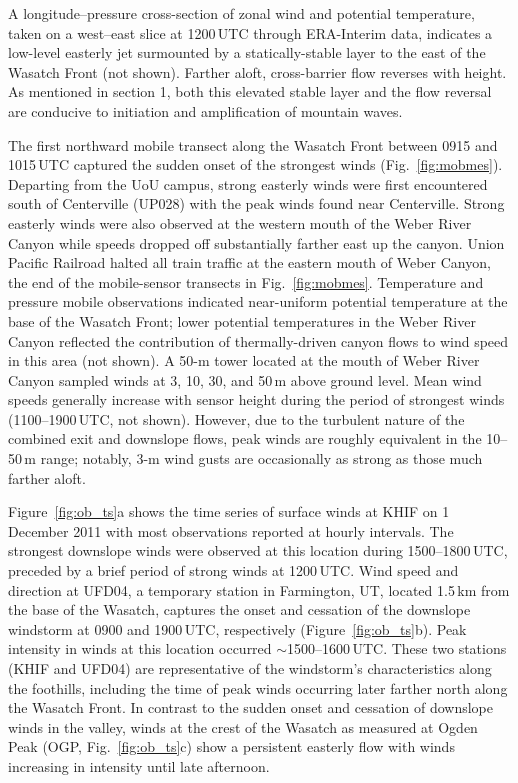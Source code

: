 \documentclass[pdftex,12pt]{article}
\def\around{$\sim$}
\begin{document}
A longitude--pressure cross-section of zonal wind and potential temperature, taken on a west--east slice at 1200\,UTC through ERA-Interim data, indicates a low-level easterly jet surmounted by a statically-stable layer to the east of the Wasatch Front (not shown). Farther aloft, cross-barrier flow reverses with height. As mentioned in section 1, both this elevated stable layer and the flow reversal are conducive to initiation and amplification of mountain waves.

The first northward mobile transect along the Wasatch Front between 0915 and 1015\,UTC captured the sudden onset of the strongest winds (Fig.~\ref{fig:mobmes}). Departing from the UoU campus, strong easterly winds were first encountered south of Centerville (UP028) with the peak winds found near Centerville. Strong easterly winds were also observed at the western mouth of the Weber River Canyon while speeds dropped off substantially farther east up the canyon. Union Pacific Railroad halted all train traffic at the eastern mouth of Weber Canyon, the end of the mobile-sensor transects in Fig.~\ref{fig:mobmes}. Temperature and pressure mobile observations indicated near-uniform potential temperature at the base of the Wasatch Front; lower potential temperatures in the Weber River Canyon reflected the contribution of thermally-driven canyon flows to wind speed in this area (not shown). A 50-m tower located at the mouth of Weber River Canyon \citep{Chrust2013} sampled winds at 3, 10, 30, and 50\,m above ground level. Mean wind speeds generally increase with sensor height during the period of strongest winds (1100--1900\,UTC, not shown). However, due to the turbulent nature of the combined exit and downslope flows, peak winds are roughly equivalent in the 10--50\,m range; notably, 3-m wind gusts are occasionally as strong as those much farther aloft.

Figure~\ref{fig:ob_ts}a shows the time series of surface winds at KHIF on 1 December 2011 with most observations reported at hourly intervals. The strongest downslope winds were observed at this location during 1500--1800\,UTC, preceded by a brief period of strong winds at 1200\,UTC. Wind speed and direction at UFD04, a temporary station in Farmington, UT, located 1.5\,km from the base of the Wasatch, captures the onset and cessation of the downslope windstorm at 0900 and 1900\,UTC, respectively (Figure~\ref{fig:ob_ts}b). Peak intensity in winds at this location occurred \around 1500--1600\,UTC. These two stations (KHIF and UFD04) are representative of the windstorm's characteristics along the foothills, including the time of peak winds occurring later farther north along the Wasatch Front. In contrast to the sudden onset and cessation of downslope winds in the valley, winds at the crest of the Wasatch as measured at Ogden Peak (OGP, Fig.~\ref{fig:ob_ts}c) show a persistent easterly flow with winds increasing in intensity until late afternoon.
\end{document}
